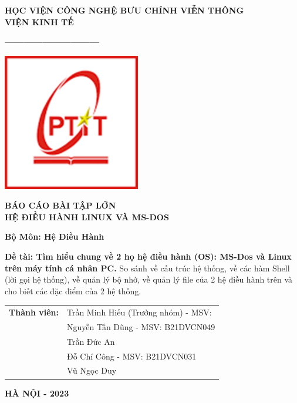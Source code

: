 \documentclass[12pt,a4paper]{article}
\begin{document}
\begin{titlepage}
	\begin{tcolorbox}[colback=white, colframe=black, width=\textwidth, height=\textheight,  boxsep=1em]
		\centering
		\vspace*{0.2cm}
		{\fontsize{15}{0} \textbf{HỌC VIỆN CÔNG NGHỆ BƯU CHÍNH VIỄN THÔNG\\VIỆN KINH TẾ}}
		
		\vspace{0.01cm}
		{\fontsize{15}{14} \textbf{------------------------------}}
		\vspace{0.8cm}
	
		\includegraphics[width=6cm]{img/logo.png} 
		
		\vspace{1cm}
			{\fontsize{18}{14} \textbf{BÁO CÁO BÀI TẬP LỚN\\HỆ ĐIỀU HÀNH LINUX VÀ MS-DOS}}
		
		\vspace{0.2cm}
		{\fontsize{18}{14} \textbf{Bộ Môn: Hệ Điều Hành}}
		
		\vspace{0.2cm}
		{\fontsize{11}{14} \textbf{Đề tài: Tìm hiểu chung về 2 họ hệ điều hành (OS): MS-Dos và Linux trên máy tính cá nhân PC.}}
		{\fontsize{11}{14} So sánh về cấu trúc hệ thống, về các hàm Shell (lời gọi hệ thống), về quản lý bộ nhớ, về quản lý file của 2 hệ điều hành trên và cho biết các đặc điểm của 2 hệ thống.}
		
		
		\vspace{2cm}
		\begin{tabular}{ll}
			{\fontsize{15}{0} \textbf{Thành viên:}} 
			& {\fontsize{14}{14}\selectfont Trần Minh Hiếu (Trưởng nhóm) - MSV: }\\
			& {\fontsize{14}{14}\selectfont Nguyễn Tấn Dũng - MSV: B21DVCN049} \\
			& {\fontsize{14}{14}\selectfont Trần Đức An} \\
			& {\fontsize{14}{14}\selectfont Đỗ Chí Công - MSV: B21DVCN031} \\
			& {\fontsize{14}{14}\selectfont Vũ Ngọc Duy} \\
		\end{tabular}
		
		\vspace{4cm}
		{\fontsize{15}{14} \textbf{HÀ NỘI - 2023}}
		
		
	\end{tcolorbox}
\end{titlepage}
\end{document}

